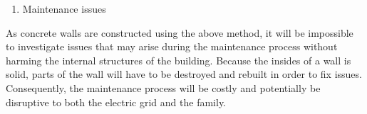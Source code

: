 \begin{enumerate}[resume]
    \item Maintenance issues
\end{enumerate}
As concrete walls are constructed using the above method, it will be impossible to investigate issues that may arise during the maintenance process without harming the internal structures of the building. Because the insides of a wall is solid, parts of the wall will have to be destroyed and rebuilt in order to fix issues. Consequently, the maintenance process will be costly and potentially be disruptive to both the electric grid and the family.